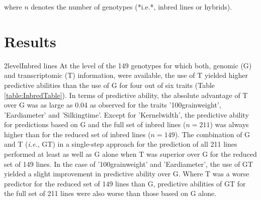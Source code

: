 \documentclass[12pt,titlepage]{article}
\begin{document}
where $n$ denotes the number of genotypes (*i.e.*, inbred lines or hybrids).












\section*{Results}
\Genetics2level{Inbred lines}
At the level of the 149 genotypes for which both, genomic (G) and 
transcriptomic (T) information, were available, the use of T yielded higher
predictive abilities than the use of G for four out of six traits
(Table \ref{table:InbredTable}).
In terms of predictive ability, the absolute advantage of T over G was as large 
as 0.04 as observed for the traits '100grainweight', 'Eardiameter' and 
'Silkingtime'.
Except for 'Kernelwidth', the predictive ability for predictions based on
G and the full set of inbred lines ($n = 211$) was always higher than for the 
reduced set of inbred lines ($n = 149$).
The combination of G and T (\textit{i.e.}, GT) in a single-step approach for the 
prediction of all 211 lines performed at least as well as G alone when T was 
superior over G for the reduced set of 149 lines.
In the case of '100grainweight' and 'Eardiameter', the use of GT yielded a 
slight improvement in predictive ability over G.
Where T was a worse predictor for the reduced set of 149 lines than G,
predictive abilities of GT for the full set of 211 lines were also worse than 
those based on G alone.
\end{document}
